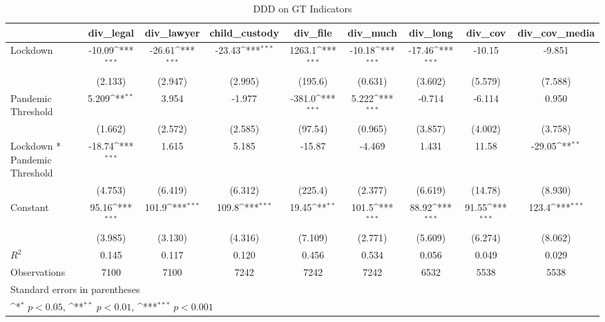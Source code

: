 \documentclass{article}
\begin{document}
{
\def\sym#1{\ifmmode^{#1}\else\(^{#1}\)\fi}
\begin{longtable}{l*{8}{c}}
\caption{DDD on GT Indicators}\\
\hline\hline\endfirsthead\hline\endhead\hline\endfoot\endlastfoot
                &\multicolumn{1}{c}{div\_legal}&\multicolumn{1}{c}{div\_lawyer}&\multicolumn{1}{c}{child\_custody}&\multicolumn{1}{c}{div\_file}&\multicolumn{1}{c}{div\_much}&\multicolumn{1}{c}{div\_long}&\multicolumn{1}{c}{div\_cov}&\multicolumn{1}{c}{div\_cov\_media}\\
\hline
Lockdown        &   -10.09\sym{***}&   -26.61\sym{***}&   -23.43\sym{***}&   1263.1\sym{***}&   -10.18\sym{***}&   -17.46\sym{***}&   -10.15         &   -9.851         \\
                &  (2.133)         &  (2.947)         &  (2.995)         &  (195.6)         &  (0.631)         &  (3.602)         &  (5.579)         &  (7.588)         \\
Pandemic Threshold&    5.209\sym{**} &    3.954         &   -1.977         &   -381.0\sym{***}&    5.222\sym{***}&   -0.714         &   -6.114         &    0.950         \\
                &  (1.662)         &  (2.572)         &  (2.585)         &  (97.54)         &  (0.965)         &  (3.857)         &  (4.002)         &  (3.758)         \\
Lockdown * Pandemic Threshold&   -18.74\sym{***}&    1.615         &    5.185         &   -15.87         &   -4.469         &    1.431         &    11.58         &   -29.05\sym{**} \\
                &  (4.753)         &  (6.419)         &  (6.312)         &  (225.4)         &  (2.377)         &  (6.619)         &  (14.78)         &  (8.930)         \\
Constant        &    95.16\sym{***}&    101.9\sym{***}&    109.8\sym{***}&    19.45\sym{**} &    101.5\sym{***}&    88.92\sym{***}&    91.55\sym{***}&    123.4\sym{***}\\
                &  (3.985)         &  (3.130)         &  (4.316)         &  (7.109)         &  (2.771)         &  (5.609)         &  (6.274)         &  (8.062)         \\
\hline
\(R^{2}\)       &    0.145         &    0.117         &    0.120         &    0.456         &    0.534         &    0.056         &    0.049         &    0.029         \\
Observations    &     7100         &     7100         &     7242         &     7242         &     7242         &     6532         &     5538         &     5538         \\
\hline\hline
\multicolumn{9}{l}{\footnotesize Standard errors in parentheses}\\
\multicolumn{9}{l}{\footnotesize \sym{*} \(p<0.05\), \sym{**} \(p<0.01\), \sym{***} \(p<0.001\)}\\
\end{longtable}
}
\end{document}
